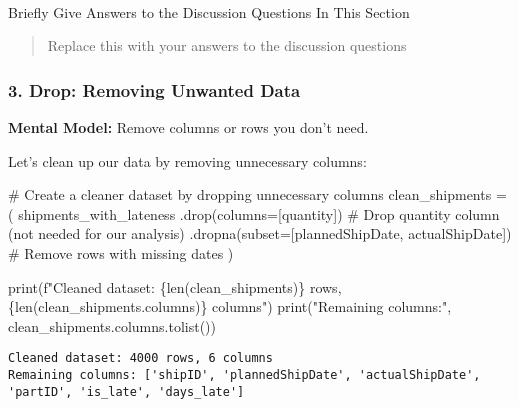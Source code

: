 \documentclass[
  letterpaper,
  DIV=11,
  numbers=noendperiod]{scrartcl}
\makeatletter
\let\oldparagraph\paragraph
\renewcommand{\paragraph}{
    \@ifstar
      \xxxParagraphStar
      \xxxParagraphNoStar
  }
\newcommand{\xxxParagraphStar}[1]{\oldparagraph*{#1}\mbox{}}
\newcommand{\xxxParagraphNoStar}[1]{\oldparagraph{#1}\mbox{}}
\newenvironment{Shaded}{\begin{snugshade}}{\end{snugshade}}
\newcommand{\BuiltInTok}[1]{\textcolor[rgb]{0.00,0.23,0.31}{#1}}
\newcommand{\CommentTok}[1]{\textcolor[rgb]{0.37,0.37,0.37}{#1}}
\newcommand{\NormalTok}[1]{\textcolor[rgb]{0.00,0.23,0.31}{#1}}
\newcommand{\OperatorTok}[1]{\textcolor[rgb]{0.37,0.37,0.37}{#1}}
\newcommand{\SpecialCharTok}[1]{\textcolor[rgb]{0.37,0.37,0.37}{#1}}
\newcommand{\SpecialStringTok}[1]{\textcolor[rgb]{0.13,0.47,0.30}{#1}}
\newcommand{\StringTok}[1]{\textcolor[rgb]{0.13,0.47,0.30}{#1}}
\makeatother
\begin{document}
\paragraph{Briefly Give Answers to the Discussion Questions In This
Section}\label{briefly-give-answers-to-the-discussion-questions-in-this-section-1}

\begin{quote}
Replace this with your answers to the discussion questions
\end{quote}

\subsubsection{3. Drop: Removing Unwanted
Data}\label{drop-removing-unwanted-data}

\textbf{Mental Model:} Remove columns or rows you don't need.

Let's clean up our data by removing unnecessary columns:

\label{mental-model-3-drop}
\begin{Shaded}
\begin{Highlighting}[]
\CommentTok{\# Create a cleaner dataset by dropping unnecessary columns}
\NormalTok{clean\_shipments }\OperatorTok{=}\NormalTok{ (}
\NormalTok{    shipments\_with\_lateness}
\NormalTok{    .drop(columns}\OperatorTok{=}\NormalTok{[}\StringTok{\textquotesingle{}quantity\textquotesingle{}}\NormalTok{])  }\CommentTok{\# Drop quantity column (not needed for our analysis)}
\NormalTok{    .dropna(subset}\OperatorTok{=}\NormalTok{[}\StringTok{\textquotesingle{}plannedShipDate\textquotesingle{}}\NormalTok{, }\StringTok{\textquotesingle{}actualShipDate\textquotesingle{}}\NormalTok{])  }\CommentTok{\# Remove rows with missing dates}
\NormalTok{)}

\BuiltInTok{print}\NormalTok{(}\SpecialStringTok{f"Cleaned dataset: }\SpecialCharTok{\{}\BuiltInTok{len}\NormalTok{(clean\_shipments)}\SpecialCharTok{\}}\SpecialStringTok{ rows, }\SpecialCharTok{\{}\BuiltInTok{len}\NormalTok{(clean\_shipments.columns)}\SpecialCharTok{\}}\SpecialStringTok{ columns"}\NormalTok{)}
\BuiltInTok{print}\NormalTok{(}\StringTok{"Remaining columns:"}\NormalTok{, clean\_shipments.columns.tolist())}
\end{Highlighting}
\end{Shaded}

\begin{verbatim}
Cleaned dataset: 4000 rows, 6 columns
Remaining columns: ['shipID', 'plannedShipDate', 'actualShipDate', 'partID', 'is_late', 'days_late']
\end{verbatim}
\end{document}
